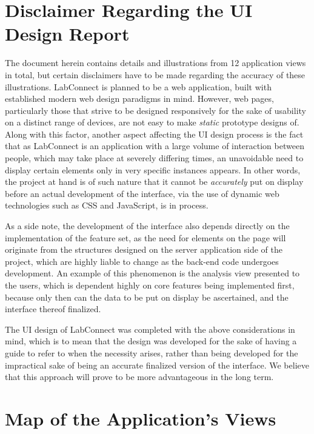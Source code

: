 \documentclass[a4paper, 12pt]{article}
\begin{document}
    \section{Disclaimer Regarding the UI Design Report}
    
    The document herein contains details and illustrations from 12 application views in total, but certain disclaimers have to be made
    regarding the accuracy of these illustrations.
    LabConnect is planned to be a web application, built with established modern web design paradigms in mind. However, web pages,
    particularly those that strive to be designed responsively for the sake of usability on a distinct range of devices, are
    not easy to make \emph{static} prototype designs of. Along with this factor, another aspect affecting the UI design process is the fact
    that as LabConnect is an application with a large volume of interaction between people, which may take place at severely
    differing times, an unavoidable need to display certain elements only in very specific instances appears. In other words, the project
    at hand is of such nature that it cannot be \emph{accurately} put on display before an actual development of the interface, via
    the use of dynamic web technologies such as CSS and JavaScript, is in process. 

    As a side note, the development of the interface also depends directly on the implementation of the feature set,
    as the need for elements on the page will originate from the structures designed on the server application side of the project, which
    are highly liable to change as the back-end code undergoes development. An example of this phenomenon is the analysis view presented to the users,
    which is dependent highly on core features being implemented first, because only then can the data to be put on display be ascertained,
    and the interface thereof finalized.
    
    The UI design of LabConnect was completed with the above considerations in mind, which is to mean that the design was developed
    for the sake of having a guide to refer to when the necessity arises, rather than being developed for the impractical sake of being an accurate
    finalized version of the interface. We believe that this approach will prove to be more advantageous in the long term.
    
    \section{Map of the Application's Views}
    
\end{document}
